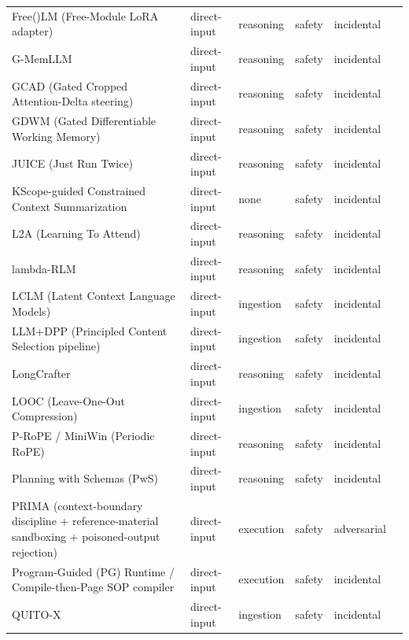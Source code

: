 \begin{longtable}{@{}p{}lllll@{}}
Free()LM (Free-Module LoRA adapter) & direct-input & reasoning & safety & incidental & \cite{zheng-2026-free} \\
G-MemLLM & direct-input & reasoning & safety & incidental & \cite{xu-2026-gmemllm} \\
GCAD (Gated Cropped Attention-Delta steering) & direct-input & reasoning & safety & incidental & \cite{kang-2026-promptactivation} \\
GDWM (Gated Differentiable Working Memory) & direct-input & reasoning & safety & incidental & \cite{mei-2026-gated} \\
JUICE (Just Run Twice) & direct-input & reasoning & safety & incidental & \cite{li-2025-taming} \\
KScope-guided Constrained Context Summarization & direct-input & none & safety & incidental & \cite{xiao-2025-kscope} \\
L2A (Learning To Attend) & direct-input & reasoning & safety & incidental & \cite{choudhary-2026-learning} \\
lambda-RLM & direct-input & reasoning & safety & incidental & \cite{roy-2026-ycombinator} \\
LCLM (Latent Context Language Models) & direct-input & ingestion & safety & incidental & \cite{li-2026-endtoend} \\
LLM+DPP (Principled Content Selection pipeline) & direct-input & ingestion & safety & incidental & \cite{padmakumar-2025-principled} \\
LongCrafter & direct-input & reasoning & safety & incidental & \cite{yuan-2026-longcrafter} \\
LOOC (Leave-One-Out Compression) & direct-input & ingestion & safety & incidental & \cite{wang-2026-alleviating} \\
P-RoPE / MiniWin (Periodic RoPE) & direct-input & reasoning & safety & incidental & \cite{huo-2026-periodic} \\
Planning with Schemas (PwS) & direct-input & reasoning & safety & incidental & \cite{xu-2025-cognitive} \\
PRIMA (context-boundary discipline + reference-material sandboxing + poisoned-output rejection) & direct-input & execution & safety & adversarial & \cite{annapureddy-2026-prima} \\
Program-Guided (PG) Runtime / Compile-then-Page SOP compiler & direct-input & execution & safety & incidental & \cite{yu-2026-compile} \\
QUITO-X & direct-input & ingestion & safety & incidental & \cite{wang-2024-quitox} \\

\end{longtable}
